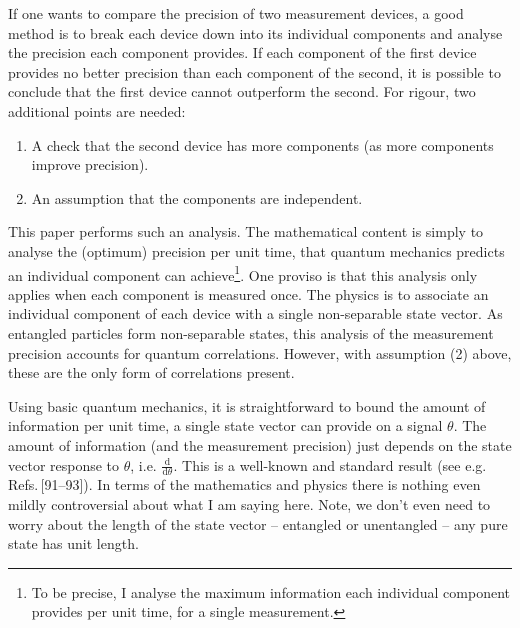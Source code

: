 \documentclass[reqno]{amsart}
\begin{document}
If one wants to compare the precision of two measurement devices, a good method is to break each device down into its individual components and analyse the precision each component provides. If each component of the first device provides no better precision than each component of the second, it is possible to conclude that the first device cannot outperform the second. For rigour, two additional points are needed:
\begin{enumerate}
\item A check that the second device has more components (as more components improve precision).
\item An assumption that the components are independent. 
\end{enumerate}

This paper performs such an analysis. The mathematical content is simply to analyse the (optimum) precision per unit time, that quantum mechanics predicts an individual component can achieve\footnote{To be precise, I analyse the maximum information each individual component provides per unit time, for a single measurement.}. One proviso is that this analysis only applies when each component is measured once. The physics is to associate an individual component of each device with a single non-separable state vector. As entangled particles form non-separable states, this analysis of the measurement precision accounts for quantum correlations. However, with assumption (2) above, these are the only form of correlations present. 

Using basic quantum mechanics, it is straightforward to bound the amount of information per unit time, a single state vector can provide on a signal $\theta$. The amount of information (and the measurement precision) just depends on the state vector response to $\theta$, i.e. $\frac{\mathrm{d}}{\mathrm{d}\theta}$. This is a well-known and standard result (see e.g. Refs.\,[\textcolor{blue!50!black}{91}--\textcolor{blue!50!black}{93}]). In terms of the mathematics and physics there is nothing even mildly controversial about what I am saying here. Note, we don't even need to worry about the length of the state vector -- entangled or unentangled -- any pure state has unit length.
\end{document}
